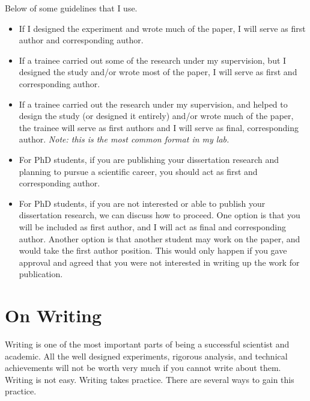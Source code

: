 \documentclass{article}
\begin{document}
Below of some guidelines that I use.
\begin{itemize}
\item If I designed the experiment and wrote much of the paper, I will serve as first author and corresponding author. 
\item If a trainee carried out some of the research under my supervision, but I designed the study and/or wrote most of the paper, I will serve as first and corresponding author.
\item If a trainee carried out the research under my supervision, and helped to design the study (or designed it entirely) and/or wrote much of the paper, the trainee will serve as first authors and I will serve as final, corresponding author. \textit{Note: this is the most common format in my lab.}
\item For PhD students, if you are publishing your dissertation research and planning to pursue a scientific career, you should act as first and corresponding author. 
\item For PhD students, if you are not interested or able to publish your dissertation research, we can discuss how to proceed. One option is that you will be included as first author, and I will act as final and corresponding author. Another option is that another student may work on the paper, and would take the first author position. This would only happen if you gave approval and agreed that you were not interested in writing up the work for publication. 
\end{itemize}

\section{On Writing}
Writing is one of the most important parts of being a successful scientist and academic. All the well designed experiments, rigorous analysis, and technical achievements will not be worth very much if you cannot write about  them.  Writing is not easy. Writing takes practice. There are several ways to gain this practice.
\end{document}
